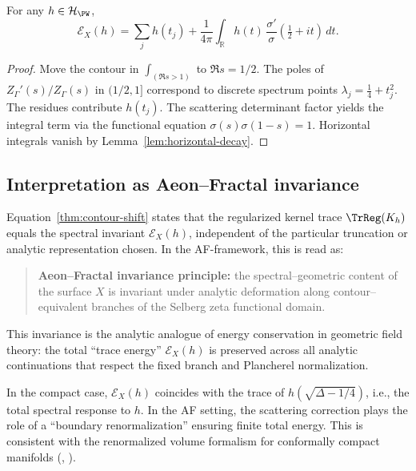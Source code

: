 \begin{theorem}\label{thm:contour-shift}
For any $h\in\mathcal{H}_{\PW}$,
\[
\mathcal{E}_X(h)
=\sum_{j}h(t_j)
+\frac{1}{4\pi}\int_{\mathbb{R}}h(t)\,
\frac{\sigma'}{\sigma}\!\left(\tfrac12+it\right)\,dt.
\]
\end{theorem}

\begin{proof}
Move the contour in $\int_{(\Re s>1)}$ to $\Re s=1/2$. The poles of
$Z_\Gamma'(s)/Z_\Gamma(s)$ in $(1/2,1]$ correspond to discrete spectrum
points $\lambda_j=\tfrac14+t_j^2$. The residues contribute $h(t_j)$.
The scattering determinant factor yields the integral term via the
functional equation $\sigma(s)\sigma(1-s)=1$. Horizontal integrals
vanish by Lemma~\ref{lem:horizontal-decay}.                             %
\end{proof}

\subsection{Interpretation as Aeon–Fractal invariance}
\label{subsec:af-invariance}
\relax\hspace{0pt}

Equation~\eqref{thm:contour-shift} states that the regularized kernel
trace $\TrReg(K_h)$ equals the spectral invariant $\mathcal{E}_X(h)$,
independent of the particular truncation or analytic representation
chosen. In the AF-framework, this is read as:

\begin{quote}
\textbf{Aeon–Fractal invariance principle:}
the spectral–geometric content of the surface $X$ is invariant under
analytic deformation along contour–equivalent branches of the Selberg
zeta functional domain.
\end{quote}

This invariance is the analytic analogue of energy conservation in
geometric field theory: the total ``trace energy'' $\mathcal{E}_X(h)$ is
preserved across all analytic continuations that respect the fixed
branch and Plancherel normalization.                                   %

\begin{remark}\label{rem:energy}
In the compact case, $\mathcal{E}_X(h)$ coincides with the trace of
$h(\sqrt{\Delta-1/4})$, i.e., the total spectral response to $h$. In
the AF setting, the scattering correction plays the role of a
``boundary renormalization'' ensuring finite total energy. This is
consistent with the renormalized volume formalism for conformally
compact manifolds (\cite{GuillopeZworski}, \cite{Borthwick}).            %
\end{remark}

